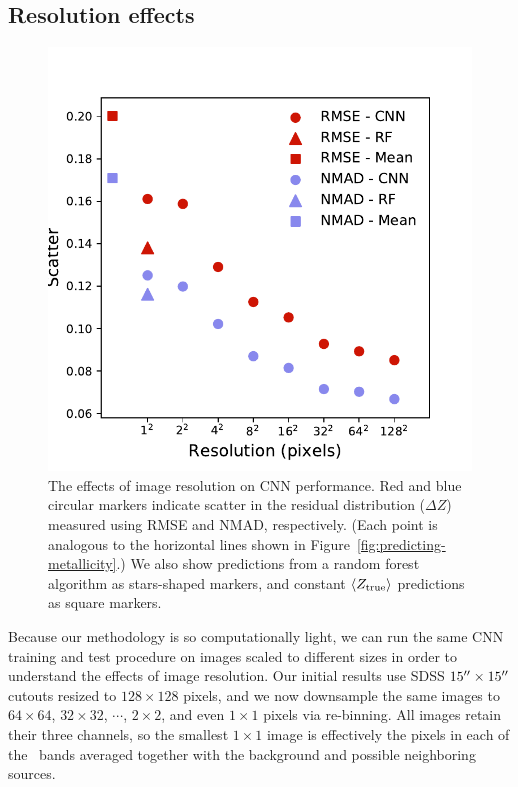 \documentclass[fleqn,usenatbib]{mnras}
\begin{document}
\subsection{Resolution effects} \label{sec:resolution}

\begin{figure}
	\includegraphics[width=\columnwidth]{04-resolution.pdf}
	\caption{\label{fig:resolution}
		The effects of image resolution on CNN performance. Red and blue circular markers indicate scatter in the residual distribution ($\Delta Z$) measured using RMSE and NMAD, respectively. (Each point is analogous to the horizontal lines shown in Figure~\ref{fig:predicting-metallicity}.) We also show predictions from a random forest algorithm as stars-shaped markers, and constant $\langle Z_{\rm true}\rangle$ predictions as square markers.}
\end{figure}

Because our methodology is so computationally light, we can run the same CNN training and test procedure on images scaled to different sizes in order to understand the effects of image resolution. Our initial results use SDSS $15\hbox{$^{\prime\prime}$} \times 15 \hbox{$^{\prime\prime}$}$ cutouts resized to $128\times 128$ pixels, and we now downsample the same images to $64\times 64$, $32 \times 32$, $\cdots$, $2\times 2$, and even $1\times 1$ pixels via re-binning. All images retain their three channels, so the smallest $1 \times 1$ image is effectively the pixels in each of the \sdssg\sdssr\sdssi\ bands averaged together with the background and possible neighboring sources.
\end{document}
